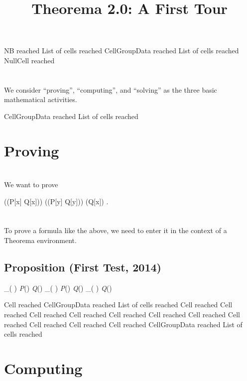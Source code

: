 \documentclass{article}
\newcommand{\light}[1]{{\color{lightgray}#1}}
\newcommand{\IffTM}[2]{#1 \leftrightarrow #2}
\newcommand{\AndTM}[2]{#1 \wedge #2}
\newcommand{\ForallTM}[2]{\forall_{#1} #2}
\newcommand{\RNG}[1]{#1}
\newcommand{\SIMPRNG}[1]{\left( #1 \right)}
\newcommand{\VarTM}[1]{\mathit{#1}}
\newcommand{\OrTM}[2]{#1 \vee #2}
\newcommand{\PredicateTM}[2]{\textit{#1}\left(#2\right)} %
\newcommand{\ImpliesTM}[2]{#1 \implies #2}
\begin{document}
% 

\title{Theorema 2.0: A First Tour}
\author{}
\date{}
\maketitle

\light{NB reached} \light{List of cells reached} \light{CellGroupData reached} \light{List of cells reached} Null\light{Cell reached} \begingroup \section*{} We consider “proving”, “computing”, and “solving” as the three basic mathematical activities.\endgroup 

\light{CellGroupData reached} \light{List of cells reached} \section{Proving}

\begingroup \section*{} We want to prove\endgroup 

\begin{center}((P[x] \lor Q[x])) \land ((P[y] \Rightarrow Q[y])) \Leftrightarrow (Q[x]) .\end{center}
\begingroup \section*{} To prove a formula like the above, we need to enter it in the context of a Theorema environment.\endgroup 

\begin{openenvironment}
\end{openenvironment}\begin{tmaenvironment}
\subsection{Proposition (First Test, 2014)}
\IffTM{\AndTM{\ForallTM{\RNG{\SIMPRNG{\VarTM{x}}}}{\OrTM{\PredicateTM{P}{\VarTM{x}}}{\PredicateTM{Q}{\VarTM{x}}}}}{\ForallTM{\RNG{\SIMPRNG{\VarTM{y}}}}{\ImpliesTM{\PredicateTM{P}{\VarTM{y}}}{\PredicateTM{Q}{\VarTM{y}}}}}}{\ForallTM{\RNG{\SIMPRNG{\VarTM{x}}}}{\PredicateTM{Q}{\VarTM{x}}}}\end{tmaenvironment}
\light{Cell reached} \light{CellGroupData reached} \light{List of cells reached} \light{Cell reached} \light{Cell reached} \light{Cell reached} \light{Cell reached} \light{Cell reached} \light{Cell reached} \light{Cell reached} \light{Cell reached} \light{Cell reached} \light{Cell reached} \light{Cell reached} \light{CellGroupData reached} \light{List of cells reached} \section{Computing}
\end{document}
